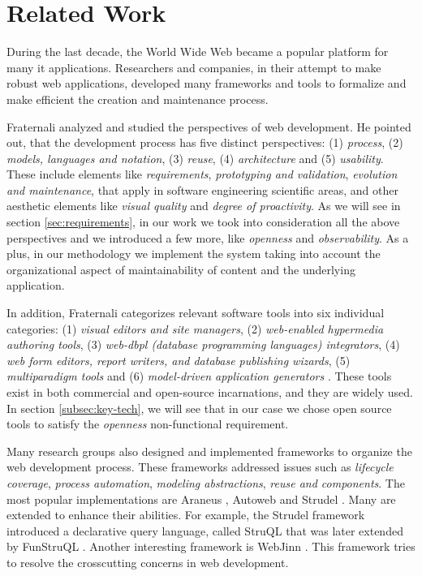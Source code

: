 \documentclass{elsart}
\begin{document}
\section{Related Work}
\label{sec:related}

During the last decade, the World Wide Web became a popular platform for many {\sc it} applications.
Researchers and companies, in their attempt to make robust web applications,
developed many frameworks and tools to formalize and make efficient the creation and maintenance process.

Fraternali \cite{FRA99} analyzed and studied the perspectives of
web development. He pointed out, that the development process has
five distinct perspectives: (1) {\em process}, (2) {\em models, languages and notation}, (3) {\em reuse}, (4) {\em architecture} and (5) {\em usability}.
These include elements like {\em requirements}, {\em  prototyping and validation}, {\em evolution and maintenance}, that apply in
software engineering scientific areas, and other aesthetic elements like {\em visual quality} and {\em degree of proactivity}.
As we will see in section \ref{sec:requirements}, in our work we took into consideration all the above perspectives and we introduced a few more, like {\em openness}
and {\em observability}.
As a plus, in our methodology we implement the system taking into account the organizational aspect of maintainability of content and the underlying application.

In addition, Fraternali categorizes relevant software tools into six individual categories: (1) {\em visual editors and site managers},
 (2) {\em web-enabled hypermedia authoring tools}, (3) {\em web-{\sc dbpl} (database programming languages) integrators}, (4) {\em web form editors, report writers,
 and database publishing wizards},
 (5) {\em multiparadigm tools} and (6) {\em model-driven application generators} \cite{FRA99}.
 These tools exist in both commercial and open-source incarnations,
and they are widely used.
 In section \ref{subsec:key-tech}, we will see that in our case we chose open source tools to satisfy the {\em openness} non-functional requirement.
 
Many research groups also designed and implemented frameworks to organize the web development process. These frameworks addressed issues
such as {\em lifecycle coverage}, {\em process automation}, {\em modeling abstractions}, {\em reuse and components}. The most popular implementations are 
Araneus \cite{MAM03}, 
Autoweb \cite{FP00} and Strudel \cite{FFLS00}. Many are extended to enhance their abilities. For example, the Strudel
framework introduced a declarative query language, called StruQL that was later extended by FunStruQL \cite{FST99}. Another interesting
framework is WebJinn \cite{KL03}. This framework tries to resolve the crosscutting concerns in web development.
\end{document}
